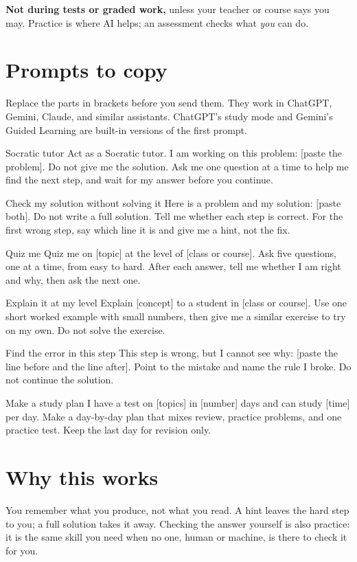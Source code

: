 \documentclass[11pt]{article}
\begin{document}
\begin{notebox}
\textbf{Not during tests or graded work,} unless your teacher or course says
you may. Practice is where AI helps; an assessment checks what \emph{you} can do.
\end{notebox}

\section{Prompts to copy}
Replace the parts in brackets before you send them. They work in ChatGPT,
Gemini, Claude, and similar assistants. ChatGPT's study mode and Gemini's
Guided Learning are built-in versions of the first prompt.

\begin{promptbox}{Socratic tutor}
Act as a Socratic tutor. I am working on this problem: [paste the problem]. Do
not give me the solution. Ask me one question at a time to help me find the
next step, and wait for my answer before you continue.
\end{promptbox}

\begin{promptbox}{Check my solution without solving it}
Here is a problem and my solution: [paste both]. Do not write a full solution.
Tell me whether each step is correct. For the first wrong step, say which line
it is and give me a hint, not the fix.
\end{promptbox}

\begin{promptbox}{Quiz me}
Quiz me on [topic] at the level of [class or course]. Ask five questions, one at
a time, from easy to hard. After each answer, tell me whether I am right and
why, then ask the next one.
\end{promptbox}

\begin{promptbox}{Explain it at my level}
Explain [concept] to a student in [class or course]. Use one short worked
example with small numbers, then give me a similar exercise to try on my own. Do
not solve the exercise.
\end{promptbox}

\begin{promptbox}{Find the error in this step}
This step is wrong, but I cannot see why: [paste the line before and the line
after]. Point to the mistake and name the rule I broke. Do not continue the
solution.
\end{promptbox}

\begin{promptbox}{Make a study plan}
I have a test on [topics] in [number] days and can study [time] per day. Make a
day-by-day plan that mixes review, practice problems, and one practice test.
Keep the last day for revision only.
\end{promptbox}

\section{Why this works}
You remember what you produce, not what you read. A hint leaves the hard step
to you; a full solution takes it away. Checking the answer yourself is also
practice: it is the same skill you need when no one, human or machine, is there
to check it for you.
\end{document}
